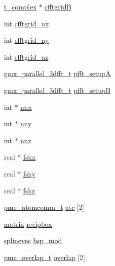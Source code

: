 \begin{DoxyCompactItemize}
\hyperlink{structt__complex}{t\-\_\-complex} $\ast$ \hyperlink{structgmx__pme_a66e3007196a8f14cf5e085d4a87218ee}{cfftgrid\-B}
\item 
int \hyperlink{structgmx__pme_ad70f22bff1ee0b95d1e1eaceeb227b0e}{cfftgrid\-\_\-nx}
\item 
int \hyperlink{structgmx__pme_a560694349bed9d9f3093b237f25ac1cf}{cfftgrid\-\_\-ny}
\item 
int \hyperlink{structgmx__pme_a14e63314d076340f54b399cdf735579b}{cfftgrid\-\_\-nz}
\item 
\hyperlink{include_2gmx__parallel__3dfft_8h_a31a1d8b5840322d92d8f8c41939b7407}{gmx\-\_\-parallel\-\_\-3dfft\-\_\-t} \hyperlink{structgmx__pme_ad26e147535d5c3c965f2a2dc8c5c9eb7}{pfft\-\_\-setup\-A}
\item 
\hyperlink{include_2gmx__parallel__3dfft_8h_a31a1d8b5840322d92d8f8c41939b7407}{gmx\-\_\-parallel\-\_\-3dfft\-\_\-t} \hyperlink{structgmx__pme_a45953b3bea638b789cc98bbfda9410a7}{pfft\-\_\-setup\-B}
\item 
int $\ast$ \hyperlink{structgmx__pme_ad23c07d97bd403394ce1fe7b04d97d6f}{nnx}
\item 
int $\ast$ \hyperlink{structgmx__pme_a3416a14ff5b7ee8fe3965f58ee4782e5}{nny}
\item 
int $\ast$ \hyperlink{structgmx__pme_aa74e93b84358a085466246cb1e0ef64d}{nnz}
\item 
real $\ast$ \hyperlink{structgmx__pme_ae1192733da736d863a47354a4ba49858}{fshx}
\item 
real $\ast$ \hyperlink{structgmx__pme_a8faf433099bd3be1ca813637af1cea0a}{fshy}
\item 
real $\ast$ \hyperlink{structgmx__pme_a5f26e02641a665ab509dc8b732824e5e}{fshz}
\item 
\hyperlink{structpme__atomcomm__t}{pme\-\_\-atomcomm\-\_\-t} \hyperlink{structgmx__pme_a443c097bcdc099a94684e9053fece127}{atc} \mbox{[}2\mbox{]}
\item 
\hyperlink{share_2template_2gromacs_2types_2simple_8h_a7ea9c2a830d3f743b887387e33645a83}{matrix} \hyperlink{structgmx__pme_a92ad0232f65dff3b5b8cdb64dd00ebbf}{recipbox}
\item 
\hyperlink{share_2template_2gromacs_2pme_8h_ae5d0a776903d496601b806a5750a220a}{splinevec} \hyperlink{structgmx__pme_af3d3be059bbd655d012288aadcdd1f29}{bsp\-\_\-mod}
\item 
\hyperlink{structpme__overlap__t}{pme\-\_\-overlap\-\_\-t} \hyperlink{structgmx__pme_a7a5d5e8ef17689b5bf0f592ba8605a74}{overlap} \mbox{[}2\mbox{]}
\item 

\end{DoxyCompactItemize}
